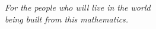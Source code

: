 \thispagestyle{empty}
\begin{center}
\textit{For the people who will live in the world}\\[1em]
\textit{being built from this mathematics.}
\end{center}

%
%
%
